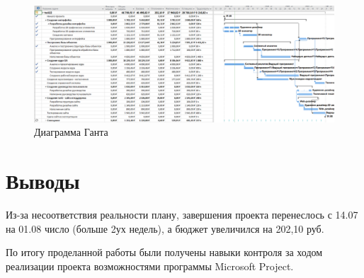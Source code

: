\begin{figure}[!h]
\centering
\includegraphics[width=1\linewidth]{inc/img/3.png}
\caption{Диаграмма Ганта}
\label{p3}
\end{figure}

\section*{Выводы}
Из-за несоответствия реальности плану, завершения проекта перенеслось с 14.07 на 01.08 число (больше 2ух недель), а бюджет увеличился на 202,10 руб.

По итогу проделанной работы были получены навыки контроля за ходом реализации проекта возможностями программы Microsoft Project.